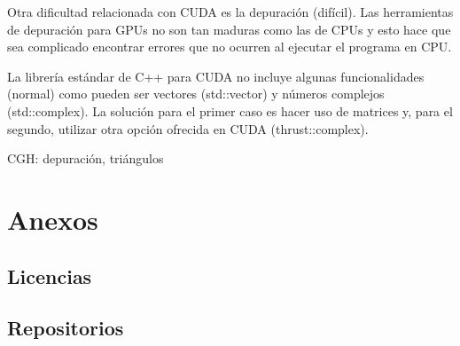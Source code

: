 \documentclass[10pt, a4paper]{article}
\begin{document}
Otra dificultad relacionada con CUDA es la depuración (difícil). Las herramientas de depuración para GPUs no son tan maduras como las de CPUs y esto hace que sea complicado encontrar errores que no ocurren al ejecutar el programa en CPU. 

La librería estándar de C++ para CUDA no incluye algunas funcionalidades (normal) como pueden ser vectores (std::vector) y números complejos (std::complex). La solución para el primer caso es hacer uso de matrices y, para el segundo, utilizar otra opción ofrecida en CUDA (thrust::complex).

CGH: depuración, triángulos

\printbibliography[heading=bibintoc]

\section{Anexos}

\subsection{Licencias}

\subsection{Repositorios}
\end{document}
